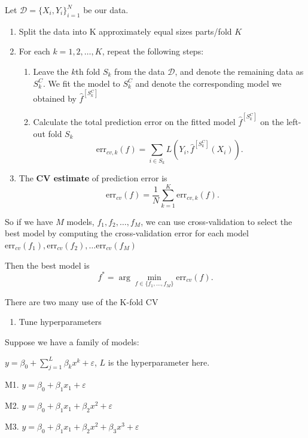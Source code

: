 \documentclass[
  letterpaper,
  DIV=11,
  numbers=noendperiod]{scrreprt}
\providecommand{\tightlist}{%
  \setlength{\itemsep}{0pt}\setlength{\parskip}{0pt}}
\begin{document}
Let \(\mathcal{D}=\{X_i,Y_i\}_{i=1}^N\) be our data.

\begin{enumerate}
\def\labelenumi{\arabic{enumi}.}
\item
  Split the data into K approximately equal sizes parts/fold \(K\)
\item
  For each \(k=1,2,\dots,K\), repeat the following steps:

  \begin{enumerate}
  \def\labelenumii{(\roman{enumii})}
  \tightlist
  \item
    Leave the \(k\)th fold \(S_k\) from the data \(\mathcal{D}\), and
    denote the remaining data as \(S_k^C\). We fit the model to
    \(S_k^C\) and denote the corresponding model we obtained by
    \(\hat{f}^{[S_k^C]}\)
  \item
    Calculate the total prediction error on the fitted model
    \(\hat{f}^{[S_k^C]}\) on the left-out fold \(S_k\) \[
      \mathrm{err}_{cv,k}(f) = \sum_{i\in S_k} L(Y_i, \hat{f}^{[S_k^C]}(X_i)).
    \]
  \end{enumerate}
\item
  The \textbf{CV estimate} of prediction error is \[
    \mathrm{err}_{cv}(f) = \frac{1}{N}\sum_{k=1}^K \mathrm{err}_{cv,k}(f).
  \]
\end{enumerate}

So if we have \(M\) models, \(f_1,f_2,\dots,f_M\), we can use
cross-validation to select the best model by computing the
cross-validation error for each model
\(\mathrm{err}_{cv}(f_1), \mathrm{err}_{cv}(f_2),\dots \mathrm{err}_{cv}(f_M)\)

Then the best model is \[
  f^*=\arg\min_{f\in\{f_1,\dots,f_M\}} \mathrm{err}_{cv}(f).
\]

There are two many use of the K-fold CV

\begin{enumerate}
\def\labelenumi{\arabic{enumi}.}
\tightlist
\item
  Tune hyperparameters
\end{enumerate}

Suppose we have a family of models:

\(y=\beta_0+\sum_{j=1}^L\beta_kx^k+\varepsilon\), \(L\) is the
hyperparameter here.

M1. \(y = \beta_0 + \beta_1 x_1 + \varepsilon\)

M2. \(y = \beta_0 + \beta_1 x_1 + \beta_2 x^2 + \varepsilon\)

M3.
\(y = \beta_0 + \beta_1 x_1 + \beta_2 x^2 + \beta_3 x^3+ \varepsilon\)
\end{document}
